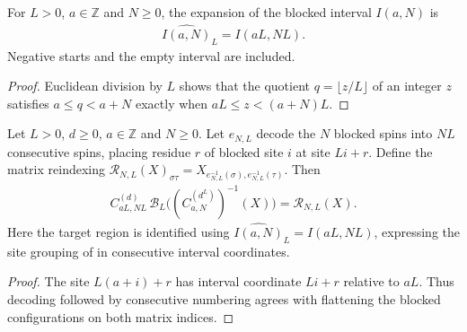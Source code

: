 \begin{lemma}
    \label{lem:qca_blocking_interval_region}
    \leanok
    For $L>0$, $a\in\mathbb Z$ and $N\geq0$, the expansion of the
    blocked interval $I(a,N)$ is
    \begin{align}
        \widehat{I(a,N)}_L=I(aL,NL).
    \end{align}
    Negative starts and the empty interval are included.
\end{lemma}
\begin{proof}\leanok
    Euclidean division by $L$ shows that the quotient $q=\lfloor z/L\rfloor$ of an integer $z$
    satisfies $a\leq q<a+N$ exactly when $aL\leq z<(a+N)L$.
\end{proof}

\begin{lemma}
    \label{thm:qca_blocking_interval_coordinates}
    \leanok
    Let $L>0$, $d\geq0$, $a\in\mathbb Z$ and $N\geq0$.
    Let $e_{N,L}$ decode the $N$ blocked spins into $NL$ consecutive
    spins, placing residue $r$ of blocked site $i$ at site $Li+r$.
    Define the matrix reindexing
    $\mathcal R_{N,L}(X)_{\sigma\tau}
        =X_{e_{N,L}^{-1}(\sigma),e_{N,L}^{-1}(\tau)}$.
    Then
    \begin{align}
        C^{(d)}_{aL,NL}\,\mathcal B_L
        \bigl((C^{(d^L)}_{a,N})^{-1}(X)\bigr)
        =\mathcal R_{N,L}(X).
    \end{align}
    Here the target region is identified using
    $\widehat{I(a,N)}_L=I(aL,NL)$, expressing the site grouping of \cite[Appendix, lines~2308 and 2313--2320]{Cirac2017MPU}
    in consecutive interval
    coordinates.
\end{lemma}
\begin{proof}\leanok
    The site $L(a+i)+r$ has interval coordinate $Li+r$ relative to $aL$.
    Thus decoding followed by consecutive numbering agrees with flattening
    the blocked configurations on both matrix indices.
\end{proof}

